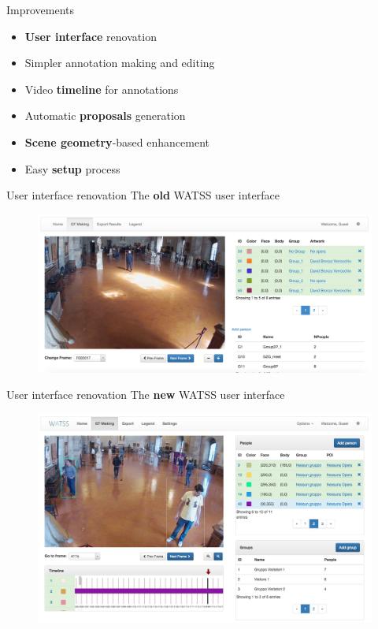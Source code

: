 \documentclass{beamer}
\begin{document}
\begin{tframe}{Improvements}
\begin{itemize}
\vspace{0.3cm}
\item \textbf{User interface} renovation
\vspace{0.2cm}
\item Simpler annotation making and editing
\vspace{0.2cm}
\item Video \textbf{timeline} for annotations
\vspace{0.2cm}
\item Automatic \textbf{proposals} generation
\vspace{0.2cm}
\item \textbf{Scene geometry}-based enhancement
\vspace{0.2cm}
\item Easy \textbf{setup} process
\end{itemize}
\end{tframe}

\begin{tframe}{User interface renovation}
The \textbf{old} WATSS user interface
\begin{figure}[h]
\centering
\includegraphics[width=1\textwidth]{images/watss_old.jpg}
\end{figure}
\end{tframe}

\begin{tframe}{User interface renovation}
The \textbf{new} WATSS user interface
\begin{figure}[h]
\centering
\includegraphics[scale=0.22]{images/watss-gui.jpg}
\end{figure}
\end{tframe}
\end{document}
